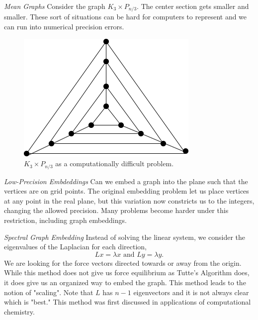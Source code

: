 \documentclass{article}
\begin{document}
     \medskip \noindent \textit{Mean Graphs}
  \newline \noindent Consider the graph $K_3 \times P_{n/3}$. The center section gets smaller and smaller. These sort of situations can be hard for computers to represent and we can run into numerical precision errors. 
    \begin{figure}[H]
    \centering
    \includegraphics[scale=0.5]{Images/clique_cross_path.png}
    \caption{$K_3 \times P_{n/3}$ as a computationally difficult problem.}
    \label{fig:my_label}
    \end{figure}  
  
    \medskip \noindent \textit{Low-Precision Embdeddings}
  \newline \noindent Can we embed a graph into the plane such that the vertices are on grid points. The original embedding problem let us place vertices at any point in the real plane, but this variation now constricts us to the integers, changing the allowed precision. Many problems become harder under this restriction, including graph embeddings. %
  
    \medskip \noindent \textit{Spectral Graph Embedding}
  \newline \noindent Instead of solving the linear system, we consider the eigenvalues of the Laplacian for each direction, $$Lx=\lambda x \text{ and } Ly=\lambda y.$$
  We are looking for the force vectors directed towards or away from the origin. While this method does not give us force equilibrium as Tutte's Algorithm does, it does give us an organized way to embed the graph. This method leads to the notion of "scaling". Note that $L$ has $n-1$ eigenvectors and it is not always clear which is "best." This method was first discussed in applications of computational chemistry.
\end{document}
